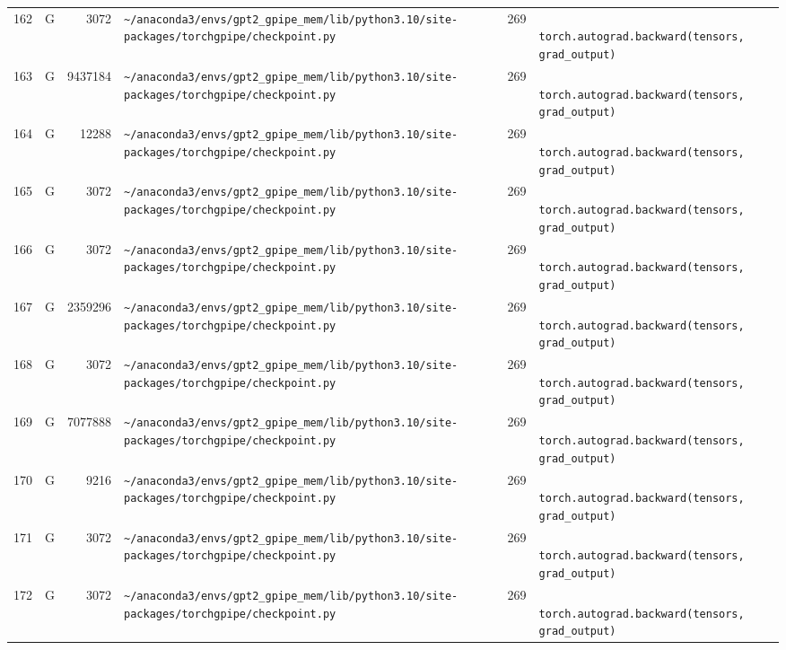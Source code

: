 \documentclass{article}
\begin{document}
\begin{longtable}{r l r p{6.5cm} r p{7.0cm}}
162 & G & 3072 & \lstinline|~/anaconda3/envs/gpt2_gpipe_mem/lib/python3.10/site-packages/torchgpipe/checkpoint.py| & 269 & \lstinline|            torch.autograd.backward(tensors, grad_output)| \\
163 & G & 9437184 & \lstinline|~/anaconda3/envs/gpt2_gpipe_mem/lib/python3.10/site-packages/torchgpipe/checkpoint.py| & 269 & \lstinline|            torch.autograd.backward(tensors, grad_output)| \\
164 & G & 12288 & \lstinline|~/anaconda3/envs/gpt2_gpipe_mem/lib/python3.10/site-packages/torchgpipe/checkpoint.py| & 269 & \lstinline|            torch.autograd.backward(tensors, grad_output)| \\
165 & G & 3072 & \lstinline|~/anaconda3/envs/gpt2_gpipe_mem/lib/python3.10/site-packages/torchgpipe/checkpoint.py| & 269 & \lstinline|            torch.autograd.backward(tensors, grad_output)| \\
166 & G & 3072 & \lstinline|~/anaconda3/envs/gpt2_gpipe_mem/lib/python3.10/site-packages/torchgpipe/checkpoint.py| & 269 & \lstinline|            torch.autograd.backward(tensors, grad_output)| \\
167 & G & 2359296 & \lstinline|~/anaconda3/envs/gpt2_gpipe_mem/lib/python3.10/site-packages/torchgpipe/checkpoint.py| & 269 & \lstinline|            torch.autograd.backward(tensors, grad_output)| \\
168 & G & 3072 & \lstinline|~/anaconda3/envs/gpt2_gpipe_mem/lib/python3.10/site-packages/torchgpipe/checkpoint.py| & 269 & \lstinline|            torch.autograd.backward(tensors, grad_output)| \\
169 & G & 7077888 & \lstinline|~/anaconda3/envs/gpt2_gpipe_mem/lib/python3.10/site-packages/torchgpipe/checkpoint.py| & 269 & \lstinline|            torch.autograd.backward(tensors, grad_output)| \\
170 & G & 9216 & \lstinline|~/anaconda3/envs/gpt2_gpipe_mem/lib/python3.10/site-packages/torchgpipe/checkpoint.py| & 269 & \lstinline|            torch.autograd.backward(tensors, grad_output)| \\
171 & G & 3072 & \lstinline|~/anaconda3/envs/gpt2_gpipe_mem/lib/python3.10/site-packages/torchgpipe/checkpoint.py| & 269 & \lstinline|            torch.autograd.backward(tensors, grad_output)| \\
172 & G & 3072 & \lstinline|~/anaconda3/envs/gpt2_gpipe_mem/lib/python3.10/site-packages/torchgpipe/checkpoint.py| & 269 & \lstinline|            torch.autograd.backward(tensors, grad_output)| \\

\end{longtable}
\end{document}
